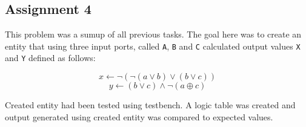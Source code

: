 \subsection{Assignment 4}

This problem was a sumup of all previous tasks. The goal here was to create
an entity that using three input ports, called \texttt{A}, \texttt{B} and
\texttt{C} calculated output values \texttt{X} and \texttt{Y} defined as
follows:

$$ x \leftarrow \neg (\neg(a \lor b) \lor (b \lor c)) $$
$$ y \leftarrow (b \lor c) \land \neg(a \oplus c) $$

Created entity had been tested using testbench. A logic table was created
and output generated using created entity was compared to expected values.
